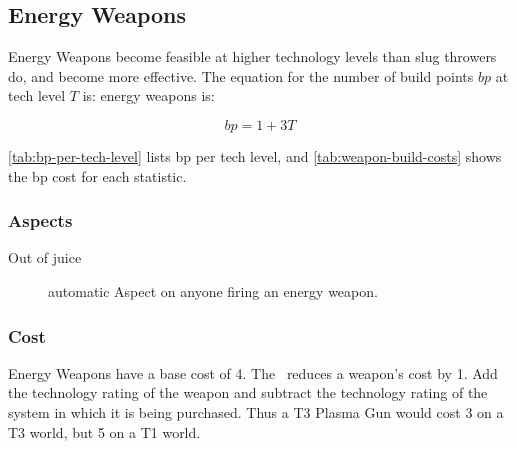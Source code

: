 \subsection{Energy Weapons}
\label{sec:energy-weapons}

Energy Weapons become feasible at higher technology levels than slug
throwers do, and become more effective. The equation for the number of build points $bp$ at tech level $T$ is:
energy weapons is:

\[ bp = 1 + 3T \]

\autoref{tab:bp-per-tech-level} lists bp per tech level, and \autoref{tab:weapon-build-costs} shows the bp cost for each statistic.

% 


\subsubsection{Aspects}
\begin{description}
\item[Out of juice]
automatic Aspect on anyone firing an energy weapon.
\end{description}

\subsubsection{Cost}

Energy Weapons have a base cost of 4. The  \Stunt\ reduces a weapon's cost by 1. Add the technology rating of the weapon and subtract the technology rating of the system in which it is being purchased. Thus a T3 Plasma Gun would cost 3 on a T3 world, but 5 on a T1 world.
